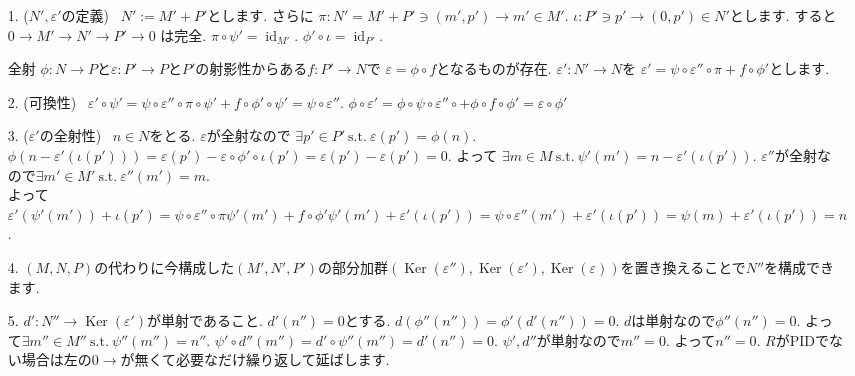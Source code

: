 \documentclass{jsarticle}
\newcommand{\makeop}[1]{\mathop{\mathrm{#1}}\nolimits}
\def\Ker{\makeop{Ker}}
\def\id{\makeop{id}}
\def\suchthat{\mathrm{\ s.t.\ }}
\theoremstyle{definition}
\numberwithin{theorem}{section}
\begin{document}
\begin{itemize}
\item[1. ($N', \varepsilon'$の定義)]\ $N' := M'+P'$とします. さらに $\pi: N'=M'+P'\ni(m', p') \rightarrow m' \in M'$.
$\iota:P'\ni p'\rightarrow (0, p') \in N'$とします. すると $0 \rightarrow M' \rightarrow N' \rightarrow P' \rightarrow 0$
は完全. $\pi\circ \psi' = \id_{M'}$. $\phi'\circ\iota = \id_{P'}$.

全射 $\phi: N\rightarrow P$と$\varepsilon: P'\rightarrow P$と$P'$の射影性からある$f: P'\rightarrow N$で
$\varepsilon = \phi\circ f$となるものが存在. $\varepsilon':N' \rightarrow N$を
$\varepsilon'=\psi\circ\varepsilon''\circ\pi+f\circ\phi'$とします.

\item[2. (可換性)]\ $\varepsilon'\circ\psi' = \psi\circ\varepsilon''\circ\pi\circ\psi' + f\circ\phi'\circ\psi' = \psi\circ\varepsilon''$.
$\phi\circ\varepsilon' = \phi\circ\psi\circ\varepsilon''\circ+\phi\circ f\circ\phi' = \varepsilon\circ\phi'$

\item[3. ($\varepsilon'$の全射性)]\ $n\in N$をとる. $\varepsilon$が全射なので
$\exists p' \in P' \suchthat \varepsilon(p') = \phi(n)$. $\phi(n-\varepsilon'(\iota(p'))) = \varepsilon(p') - \varepsilon\circ\phi'\circ\iota(p') = \varepsilon(p') - \varepsilon(p') = 0$. よって $\exists m \in M \suchthat \psi'(m') = n-\varepsilon'(\iota(p'))$. $\varepsilon''$が全射なので$\exists m'\in M' \suchthat \varepsilon''(m') = m$.\\
よって $\varepsilon'(\psi'(m')) + \iota(p') = \psi\circ\varepsilon''\circ\pi\psi'(m') + f\circ\phi'\psi'(m') + \varepsilon'(\iota(p')) = \psi\circ\varepsilon''(m') + \varepsilon'(\iota(p')) = \psi(m) + \varepsilon'(\iota(p')) = n$.

\item[4. ] $(M, N, P)$の代わりに今構成した$(M', N', P')$の部分加群$(\Ker(\varepsilon''), \Ker(\varepsilon'), \Ker(\varepsilon))$を置き換えることで$N''$を構成できます. 

\item[5. ] $d': N'' \rightarrow \Ker(\varepsilon')$が単射であること. $d'(n'') = 0$とする. $d(\phi''(n'')) = \phi'(d'(n'')) = 0$. $d$は単射なので$\phi''(n'') = 0$. よって$\exists m'' \in M'' \suchthat \psi''(m'') = n''$. $\psi'\circ d''(m'') = d'\circ\psi''(m'') = d'(n'') = 0$. $\psi', d''$が単射なので$m'' = 0$.
よって$n'' = 0$. $R$がPIDでない場合は左の$0 \rightarrow$が無くて必要なだけ繰り返して延ばします.
\end{itemize}
\end{document}
